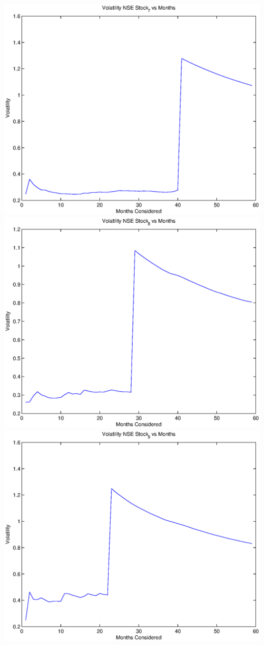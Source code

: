 \documentclass{article}
\begin{document}
\includegraphics[width=\textwidth]{Volatility_NSE_Stock_7_vs_Months} \\

\includegraphics[width=\textwidth]{Volatility_NSE_Stock_8_vs_Months} \\

\includegraphics[width=\textwidth]{Volatility_NSE_Stock_9_vs_Months} \\
\end{document}
